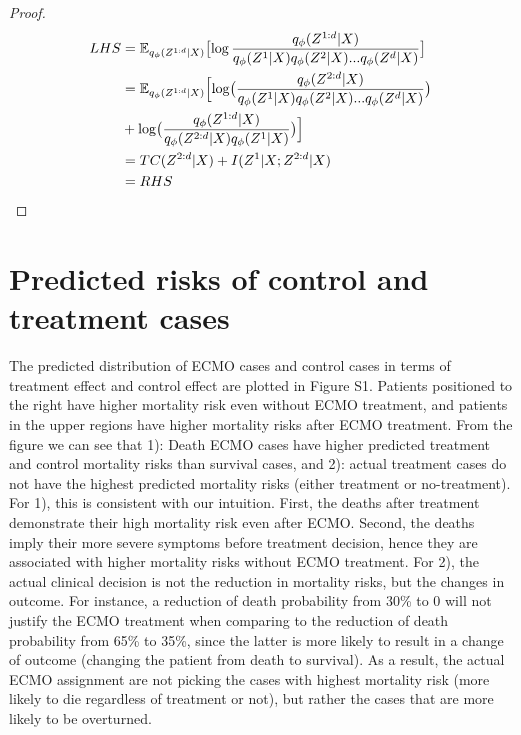 \begin{proof}
\begin{equation}
\begin{split}
    LHS &=\mathbb{E}_{q_{\phi}(Z^{1:d}|X)} \bigl[ \log \frac{q_{\phi}(Z^{1:d}|X)}{q_{\phi}(Z^1|X)q_{\phi}(Z^2|X)...q_{\phi}(Z^d|X)}  \bigl] \\
    &= \mathbb{E}_{q_{\phi}(Z^{1:d}|X)} 
    \Bigl[ \log \bigl(\frac{q_{\phi}(Z^{2:d}|X)}
    {q_{\phi}(Z^1|X)q_{\phi}(Z^2|X)...q_{\phi}(Z^d|X)}\bigr) \\
    &+ \log \bigl(\frac{q_{\phi}(Z^{1:d}|X)}
    {q_{\phi}(Z^{2:d}|X)q_{\phi}(Z^1|X)}\bigr)\Bigr] \\
    &= TC(Z^{2:d}|X) 
    + I(Z^1|X;Z^{2:d}|X) \\
    &= RHS 
\end{split}
\end{equation}
\end{proof}

\section{Predicted risks of control and treatment cases}
The predicted distribution of ECMO cases and control cases in terms of treatment effect and control effect are plotted in Figure S1. Patients positioned to the right have higher mortality risk even without ECMO treatment, and patients in the upper regions have higher mortality risks after ECMO treatment. From the figure we can see that 1): Death ECMO cases have higher predicted treatment and control mortality risks than survival cases, and 2): actual treatment cases do not have the highest predicted mortality risks (either treatment or no-treatment).  
For 1), this is consistent with our intuition. First, the deaths after treatment demonstrate their high mortality risk even after ECMO. Second, the deaths imply their more severe symptoms before treatment decision, hence they are associated with higher mortality risks without ECMO treatment.  For 2), the actual clinical decision is not the reduction in mortality risks, but the changes in outcome. For instance, a reduction of death probability from 30\% to 0 will not justify the ECMO treatment when comparing to the reduction of death probability from 65\% to 35\%, since the latter is more likely to result in a change of outcome (changing the patient from death to survival). As a result, the actual ECMO assignment are not picking the cases with highest mortality risk (more likely to die regardless of treatment or not), but rather the cases that are more likely to be overturned. 

